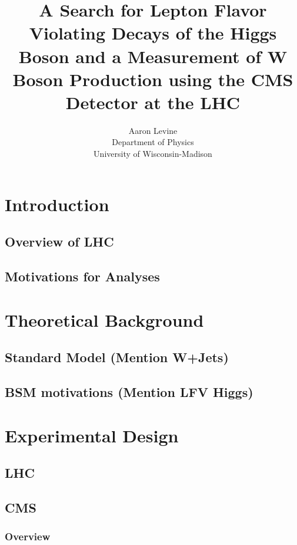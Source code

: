 \documentclass{article}
\begin{document}
\title{A Search for Lepton Flavor Violating Decays of the Higgs Boson and a Measurement of W Boson Production using the CMS Detector at the LHC}
\author{Aaron Levine\\ Department of Physics\\University of Wisconsin-Madison}
\date{}
\maketitle
\newpage
\tableofcontents
\setcounter{tocdepth}{1}
\section{Introduction}

\subsection{Overview of LHC}

\subsection{Motivations for Analyses}

\section{Theoretical Background}

\subsection{Standard Model (Mention W+Jets)}

\subsection{BSM motivations (Mention LFV Higgs)}

\section{Experimental Design}
\subsection{LHC}
\subsection{CMS}
\subsubsection{Overview}
\end{document}
